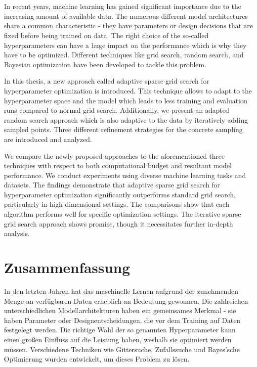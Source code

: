 \chapter{\abstractname}

In recent years, machine learning has gained significant importance due to the increasing amount of available data. The numerous different model architectures share a common characteristic - they have parameters or design decisions that are fixed before being trained on data. The right choice of the so-called hyperparameters can have a huge impact on the performance which is why they have to be optimized. Different techniques like grid search, random search, and Bayesian optimization have been developed to tackle this problem.

In this thesis, a new approach called adaptive sparse grid search for hyperparameter optimization is introduced. This technique allows to adapt to the hyperparameter space and the model which leads to less training and evaluation runs compared to normal grid search. Additionally, we present an adapted random search approach which is also adaptive to the data by iteratively adding sampled points. Three different refinement strategies for the concrete sampling are introduced and analyzed.

We compare the newly proposed approaches to the aforementioned three techniques with respect to both computational budget and resultant model performance. We conduct experiments using diverse machine learning tasks and datasets. The findings demonstrate that adaptive sparse grid search for hyperparameter optimization significantly outperforms standard grid search, particularly in high-dimensional settings. The comparisons show that each algorithm performs well for specific optimization settings. The iterative sparse grid search approach shows promise, though it necessitates further in-depth analysis.

\chapter*{Zusammenfassung} 

In den letzten Jahren hat das maschinelle Lernen aufgrund der zunehmenden Menge an verfügbaren Daten erheblich an Bedeutung gewonnen. Die zahlreichen unterschiedlichen Modellarchitekturen haben ein gemeinsames Merkmal - sie haben Parameter oder Designentscheidungen, die vor dem Training auf Daten festgelegt werden. Die richtige Wahl der so genannten Hyperparameter kann einen großen Einfluss auf die Leistung haben, weshalb sie optimiert werden müssen. Verschiedene Techniken wie Gittersuche, Zufallssuche und Bayes'sche Optimierung wurden entwickelt, um dieses Problem zu lösen.


